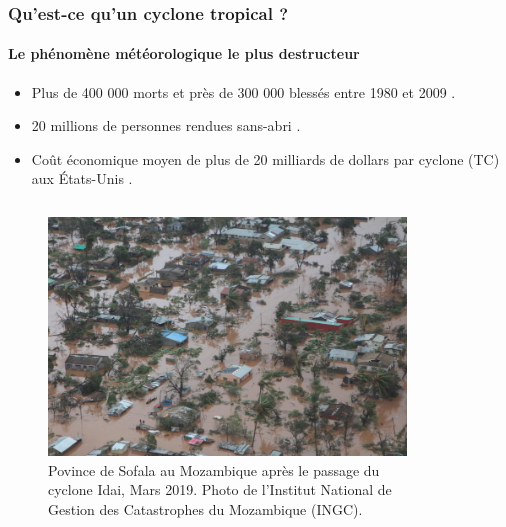 \documentclass[aspectratio=169, usepdftitle=false, xcolor={dvipsnames}, 9pt]{beamer}
\begin{document}
\begin{frame}[c]
    \frametitle{Qu'est-ce qu'un cyclone tropical ?}
    \framesubtitle{Le phénomène météorologique le plus destructeur}
    \begin{definition}
        \footnotesize
        \begin{itemize}
            \item Plus de 400 000 morts et près de 300 000 blessés entre 1980 et 2009 \parencite{doocy_human_2013}.
            \item 20 millions de personnes rendues sans-abri \parencite{doocy_human_2013}.
            \item Coût économique moyen de plus de 20 milliards de dollars par cyclone (TC) aux États-Unis \parencite{smith_billiondollar_2020}.
        \end{itemize} 
    \end{definition}
    \begin{columns}
        \begin{column}{0.45\textwidth}
            \begin{figure}[h]
                \centering
                \includegraphics[width=0.97\textwidth]{Figures/idai_2019_sofala_province.jpg}
                \caption{Povince de Sofala au Mozambique après le passage du \mbox{cyclone} Idai, Mars 2019. Photo de l'Institut National
                de Gestion des Catastrophes du Mozambique (INGC).}
            \end{figure}
        \end{column}
        \begin{column}{0.45\textwidth}
             \begin{figure}[h]
                 \centering

\end{figure}
\end{column}
\end{columns}
\end{frame}
\end{document}
